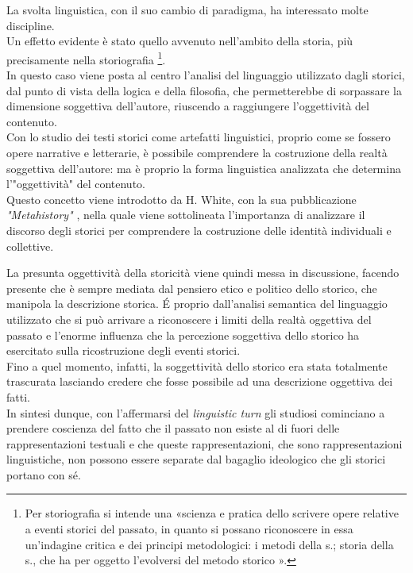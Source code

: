 La svolta linguistica, con il suo cambio di paradigma, ha interessato molte discipline.\\
Un effetto evidente è stato quello avvenuto nell'ambito della storia, più precisamente nella storiografia \parencite{Toews_linguistic} \footnote{Per storiografia si intende una «scienza e pratica dello scrivere opere relative a eventi storici del passato, in quanto si possano riconoscere in essa un’indagine critica e dei principi metodologici: i metodi della s.; storia della s., che ha per oggetto l’evolversi del metodo storico \parencite{storiografia}».}.\\
In questo caso viene posta al centro l'analisi del linguaggio utilizzato dagli storici, dal punto di vista della logica e della filosofia, che permetterebbe di sorpassare la dimensione soggettiva dell'autore, riuscendo a raggiungere l'oggettività del contenuto.\\
Con lo studio dei testi storici come artefatti linguistici, proprio come se fossero opere narrative e letterarie, è possibile comprendere la costruzione della realtà soggettiva dell'autore: ma è proprio la forma linguistica analizzata che determina l'"oggettività" del contenuto.\\
Questo concetto viene introdotto da H. White, con la sua pubblicazione \textit{"Metahistory"} \parencite{white}, nella quale viene sottolineata l'importanza di analizzare il discorso degli storici per comprendere la costruzione delle identità individuali e collettive. 

La presunta oggettività della storicità viene quindi messa in discussione, facendo presente che è sempre mediata dal pensiero etico e politico dello storico, che manipola la descrizione storica. É proprio dall’analisi semantica del linguaggio utilizzato che si può arrivare a riconoscere i limiti della realtà oggettiva del passato e l’enorme influenza che la percezione soggettiva dello storico ha esercitato sulla ricostruzione degli eventi storici.\\
Fino a quel momento, infatti, la soggettività dello storico era stata totalmente trascurata lasciando credere che fosse possibile ad una descrizione oggettiva dei fatti.\\
In sintesi dunque, con l’affermarsi del \textit{linguistic turn} gli studiosi cominciano a prendere coscienza del fatto che il passato non esiste al di fuori delle rappresentazioni testuali e che queste rappresentazioni, che sono rappresentazioni linguistiche, non possono essere separate dal bagaglio ideologico che gli storici portano con sé. 

